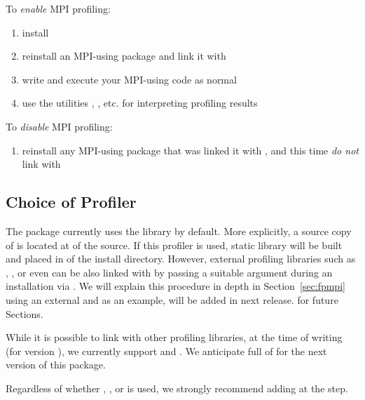 To \emph{enable} MPI profiling:
\begin{enumerate}
  \item install 
  \item reinstall an MPI-using package and link it with 
  \item write and execute your MPI-using  code as normal
  \item use the  utilities , , etc. 
for interpreting profiling results
\end{enumerate}
To \emph{disable} MPI profiling:
\begin{enumerate}
  \item reinstall any MPI-using package that was linked it with , 
and this time \emph{do not} link with 
\end{enumerate}



\subsection{Choice of Profiler}

The  package currently uses the  library by default.  
More explicitly, a source copy of  is located at 
 of the  source.  If this profiler is used, 
static library will be built and placed in 
of the  install directory.  However, external profiling 
libraries such as , , or even   can be also 
linked with  by passing a suitable  
argument during an installation via . We will explain this 
procedure in depth in Section~\ref{sec:fpmpi} using an external  and 
as an example,  will be added in next release.
for future Sections.

While it is possible to link with other profiling libraries, at the time of 
writing (for version \profversion), we currently support  and .  We anticipate full 
of  for the next version of this package.

{\color{red}
Regardless of whether , , or  is used, we 
strongly recommend adding  at the  step.
}


